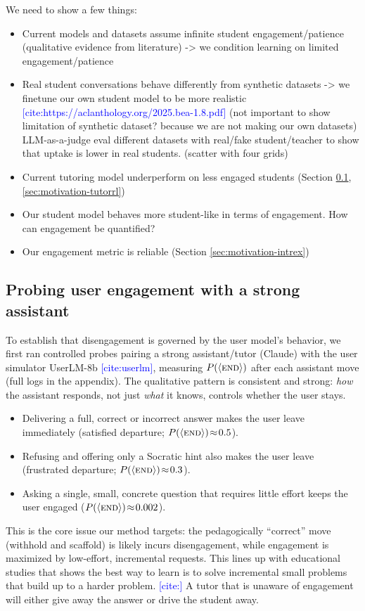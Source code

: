 \documentclass[11pt]{article}
\newcommand{\cit}[1]{\textcolor{blue}{[\textsf{cite:#1}]}}
\begin{document}
We need to show a few things:
\begin{itemize}
    \item Current models and datasets assume infinite student engagement/patience (qualitative evidence from literature) -> we condition learning on limited engagement/patience
    \item Real student conversations behave differently from synthetic datasets -> we finetune our own student model to be more realistic \cit{https://aclanthology.org/2025.bea-1.8.pdf} (not important to show limitation of synthetic dataset? because we are not making our own datasets) LLM-as-a-judge eval different datasets with real/fake student/teacher to show that uptake is lower in real students. (scatter with four grids)
    \item Current tutoring model underperform on less engaged students (Section \ref{sec:motivation-probe}, \ref{sec:motivation-tutorrl})
    \item Our student model behaves more student-like in terms of engagement. How can engagement be quantified?
    \item Our engagement metric is reliable (Section \ref{sec:motivation-intrex})
\end{itemize}

\subsection{Probing user engagement with a strong assistant}
\label{sec:motivation-probe}

To establish that disengagement is governed by the user model's behavior, we first ran controlled probes pairing a strong assistant/tutor (Claude) with the user simulator UserLM-8b \cit{userlm}, measuring $P(\langle\textsc{end}\rangle)$ after each assistant move (full logs in the appendix). 
The qualitative pattern is consistent and strong: \emph{how} the assistant responds, not just \emph{what} it knows, controls whether the user stays.
\begin{itemize}
  \item Delivering a full, correct or incorrect answer makes the user leave immediately
        (satisfied departure; $P(\langle\textsc{end}\rangle)\!\approx\!0.5$).
  \item Refusing and offering only a Socratic hint also makes the user
        leave (frustrated departure; $P(\langle\textsc{end}\rangle)\!\approx\!0.3$).
  \item Asking a single, small, concrete question that requires little effort
        keeps the user engaged ($P(\langle\textsc{end}\rangle)\!\approx\!0.002$).
\end{itemize}
This is the core issue our method targets: the pedagogically ``correct'' move (withhold and scaffold) is likely incurs disengagement, while engagement is maximized by low-effort, incremental requests. 
This lines up with educational studies that shows the best way to learn is to solve incremental small problems that build up to a harder problem. \cit{}
A tutor that is unaware of engagement will either give away the answer or drive the student away.
\end{document}
